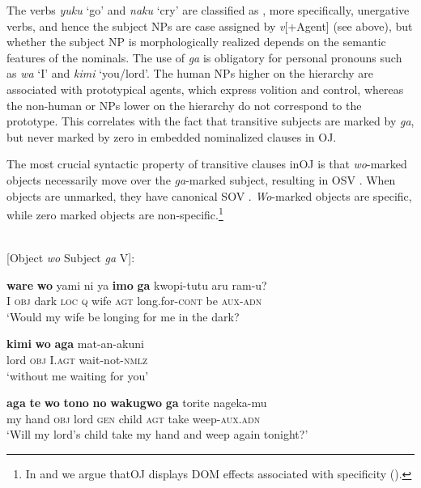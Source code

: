 \documentclass[output=paper]{LSP/langsci}
\begin{document}
The verbs \textit{yuku} `go’ and \textit{naku} ‘cry’ are classified as , more specifically, unergative verbs, and hence the subject NPs are case assigned by \textit{v}[+Agent] (see  above), but whether the subject NP is morphologically realized depends on the semantic features of the nominals. 
The use of \textit{ga} is obligatory for personal pronouns such as \textit{wa} ‘I’ and \textit{kimi} ‘you/lord’. 
The human NPs higher on the hierarchy are associated with prototypical agents, which express volition and control, whereas the non-human or  NPs lower on the hierarchy do not correspond to the  prototype. 
This correlates with the fact that transitive subjects are marked by \textit{ga}, but never marked by zero in embedded nominalized clauses in OJ.

The most crucial syntactic property of transitive clauses inOJ  is that \textit{wo}-marked objects necessarily move over the \textit{ga}{}-marked subject, resulting in OSV  . 
When objects are unmarked, they have canonical SOV   \citep{Yanagida2006Word,Yanagidaetal2009Word}. 
\textit{Wo}{}-marked objects are specific, while zero marked objects are non-specific.\footnote{In \citet{Yanagidaetal2009Word} and \citet{ Frellesvigetal2015Differential,Frellesvigetal2017Diachronic} we argue thatOJ  displays DOM effects associated with specificity (\cf \citealt{Aissen2003Differential}).}


\begin{exe}
\ex {}\\ \label{14-ya-ex:11}%
[Object \textit{wo} Subject \textit{ga} V]:

\begin{xlist}
\ex
\label{14-ya-ex:11a}
\gll \textbf{ware} \textbf{wo} yami ni ya \textbf{imo} \textbf{ga} kwopi-tutu aru ram-u?\\ %
I \textsc{obj} dark \textsc{loc} \textsc{q} wife \textsc{agt} long.for-\textsc{cont} be \textsc{aux}-\textsc{adn}\\
\glt ‘Would my wife be longing for me in the dark?

\ex
\label{14-ya-ex:11b}
\gll \textbf{kimi} \textbf{wo} \textbf{aga} mat-an-akuni\\ %
lord \textsc{obj} I.\textsc{agt} wait-not-\textsc{nmlz}\\
\glt ‘without me waiting for you’ 

\ex
\label{14-ya-ex:11c}
\gll \textbf{aga} \textbf{te} \textbf{wo} \textbf{tono} \textbf{no} \textbf{wakugwo} \textbf{ga} torite nageka-mu\\ %
my hand \textsc{obj} lord \textsc{gen} child \textsc{agt} take weep-\textsc{aux}.\textsc{adn}\\
\glt ‘Will my lord’s child take my hand and weep again tonight?’
\end{xlist}
\end{exe}
\end{document}
